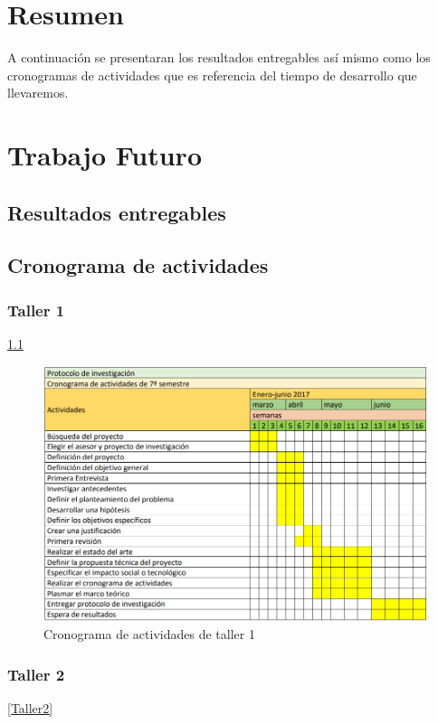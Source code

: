 \chapter*{Resumen}
A continuación se presentaran los resultados entregables así mismo como los cronogramas de actividades que es referencia del tiempo de desarrollo que llevaremos.
 \chapter{Trabajo Futuro}

 \section{Resultados entregables}


\section{Cronograma de actividades}
    \subsection{Taller 1}\ref{Taller1}
    \begin{figure}[h]

      \centering
      \includegraphics[scale=.7]{lib/assets/cronograma-1}
      \caption{Cronograma de actividades de taller 1}
      \label{Taller1}
    \end{figure}

    \subsection{Taller 2}\ref{Taller2}

